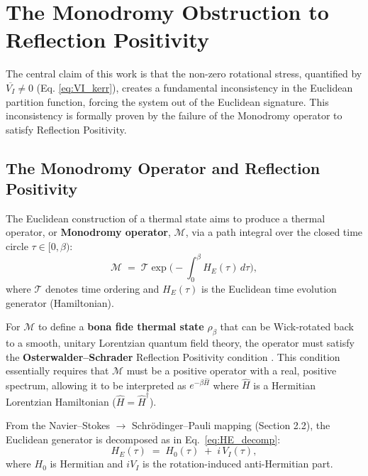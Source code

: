 \documentclass[11pt]{article}
\begin{document}
\section{The Monodromy Obstruction to Reflection Positivity}

The central claim of this work is that the non-zero rotational stress, quantified by $\overline{V_I} \neq 0$ (Eq. \ref{eq:VI_kerr}), creates a fundamental inconsistency in the Euclidean partition function, forcing the system out of the Euclidean signature. This inconsistency is formally proven by the failure of the Monodromy operator to satisfy Reflection Positivity\cite{OsterwalderSchrader1973}.

\subsection{The Monodromy Operator and Reflection Positivity}
\label{subsec:monodromy-rp}

The Euclidean construction of a thermal state aims to produce a thermal operator, or \textbf{Monodromy operator}, $\mathcal{M}$, via a path integral over the closed time circle $\tau \in [0, \beta)$:
\begin{equation}\label{eq:monodromy_def}
    \mathcal M \;=\; \mathcal T\exp\Big(-\int_0^\beta H_E(\tau)\,d\tau\Big),
\end{equation}
where $\mathcal T$ denotes time ordering and $H_E(\tau)$ is the Euclidean time evolution generator (Hamiltonian).

For $\mathcal{M}$ to define a \textbf{bona fide thermal state} $\rho_\beta$ that can be Wick-rotated back to a smooth, unitary Lorentzian quantum field theory, the operator must satisfy the \textbf{Osterwalder--Schrader} Reflection Positivity condition \cite{OsterwalderSchrader1973}. This condition essentially requires that $\mathcal{M}$ must be a positive operator with a real, positive spectrum, allowing it to be interpreted as $e^{-\beta \widehat{H}}$ where $\widehat{H}$ is a Hermitian Lorentzian Hamiltonian ($\widehat{H} = \widehat{H}^\dagger$).

From the Navier--Stokes $\to$ Schr\"odinger--Pauli mapping (Section 2.2), 
   the Euclidean generator is decomposed as in Eq.~\eqref{eq:HE_decomp}:
   \begin{equation}
       H_E(\tau) \;=\; H_0(\tau) \;+\; i\,V_I(\tau),
   \end{equation}
   where $H_0$ is Hermitian and $iV_I$ is the rotation-induced anti-Hermitian part.
\end{document}
